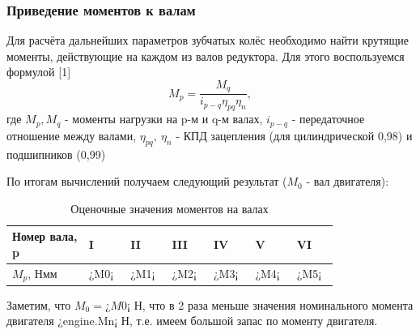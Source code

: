 \documentclass[14pt,a4paper,russian]{scrartcl}
\begin{document}
    \subsubsection{Приведение моментов к валам}
        Для расчёта дальнейших параметров зубчатых колёс необходимо найти крутящие моменты,
        действующие на каждом из валов редуктора. Для этого воспользуемся формулой [1]
        \[ M_p = \frac{M_q}{i_{p-q}\eta_{pq}\eta_n}, \]
        где \( M_p, M_q \) - моменты нагрузки на p-м и q-м валах,
            \( i_{p-q} \) - передаточное отношение между валами,
            \( \eta_{pq},\ \eta_n \) - КПД зацепления (для цилиндрической 0,98) и подшипников (0,99)\par
        
        По итогам вычислений получаем следующий результат (\( M_0 \) - вал двигателя):
        \begin{table}[h!]
            \begin{center}
                \begin{tabular}{p{0.2\linewidth}p{0.1\linewidth}p{0.1\linewidth}p{0.1\linewidth}p{0.1\linewidth}p{0.1\linewidth}p{0.1\linewidth}}
                    \hline
                    Номер вала, p & I & II & III & IV & V & VI \\
                    \hline
                    \( M_p \), Нмм & ¿M0¡ & ¿M1¡ & ¿M2¡ & ¿M3¡ & ¿M4¡ & ¿M5¡ \\
                    \hline
                \end{tabular}
                \caption{Оценочные значения моментов на валах}\label{tab:moments__shaft_estimate}
            \end{center}
        \end{table}

        Заметим, что \( M_0=¿M0¡ \) Н, что в 2 раза меньше значения номинального момента двигателя ¿engine.Mn¡ Н,
        т.е. имеем большой запас по моменту двигателя.
\end{document}
